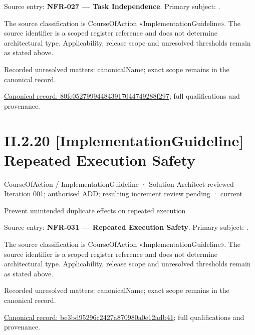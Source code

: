 Source entry: \textbf{NFR-027 — Task Independence}. Primary subject: \texttt{}.



The source classification is CourseOfAction «ImplementationGuideline». The source identifier is a scoped register reference and does not determine architectural type. Applicability, release scope and unresolved thresholds remain as stated above.


{\small Recorded unresolved matters: canonicalName; exact scope remains in the canonical record.}\par
{\footnotesize \href{../../../../../../../continuum/strategy/course-of-action/implementation-guideline/80fe052799944843917044749288f297.md}{Canonical record: 80fe052799944843917044749288f297}; full qualifications and provenance.}\par
\section*{II.2.20 [ImplementationGuideline] Repeated Execution Safety}
\label{navigation:II.2.20}

\label{element:be3bd95296c2427a870980a0e12adb41}
{\small CourseOfAction / ImplementationGuideline · Solution Architect-reviewed Iteration 001; authorised ADD; resulting increment review pending · current}\par

Prevent unintended duplicate effects on repeated execution



Source entry: \textbf{NFR-031 — Repeated Execution Safety}. Primary subject: \texttt{}.



The source classification is CourseOfAction «ImplementationGuideline». The source identifier is a scoped register reference and does not determine architectural type. Applicability, release scope and unresolved thresholds remain as stated above.


{\small Recorded unresolved matters: canonicalName; exact scope remains in the canonical record.}\par
{\footnotesize \href{../../../../../../../continuum/strategy/course-of-action/implementation-guideline/be3bd95296c2427a870980a0e12adb41.md}{Canonical record: be3bd95296c2427a870980a0e12adb41}; full qualifications and provenance.}\par
